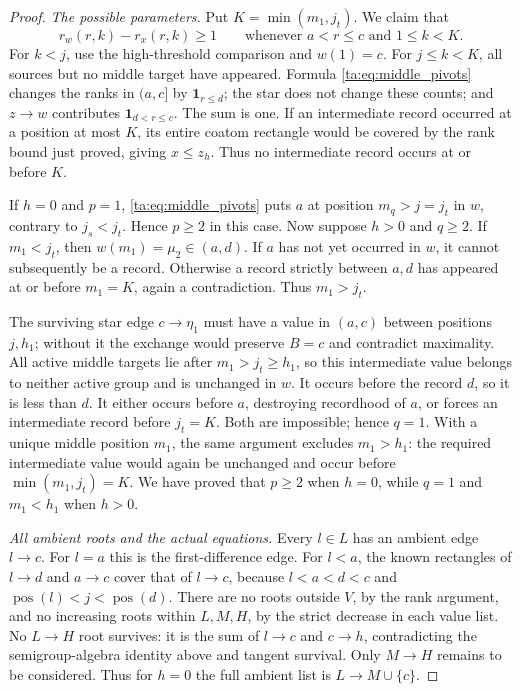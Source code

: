 \begin{proof}
\smallskip\noindent\emph{The possible parameters.}
Put $K=\min(m_1,j_t)$. We claim that
\[
 r_w(r,k)-r_x(r,k)\geq1
 \qquad\text{whenever }a<r\leq c\text{ and }1\leq k<K.
\]
For $k<j$, use the high-threshold comparison and $w(1)=c$.
For $j\leq k<K$, all sources but no middle target have appeared.
Formula \eqref{ta:eq:middle_pivots} changes the ranks in $(a,c]$
by $\mathbf1_{r\leq d}$; the star does not change these counts;
and $z\to w$ contributes $\mathbf1_{d<r\leq c}$. The sum is one.
If an intermediate record occurred at a position at most $K$, its
entire coatom rectangle would be covered by
the rank bound just proved, giving $x\leq z_h$.
Thus no intermediate record occurs at or before $K$.

If $h=0$ and $p=1$, \eqref{ta:eq:middle_pivots} puts $a$ at position
$m_q>j=j_t$ in $w$, contrary to $j_s<j_t$. Hence $p\geq2$ in this
case. Now suppose $h>0$ and $q\geq2$. If $m_1<j_t$, then
$w(m_1)=\mu_2\in(a,d)$. If $a$ has not yet occurred in $w$, it
cannot subsequently be a record. Otherwise a record strictly between
$a,d$ has appeared at or before $m_1=K$, again a contradiction.
Thus $m_1>j_t$.

The surviving star edge $c\to\eta_1$ must have a value in $(a,c)$
between positions $j,h_1$; without it the exchange would preserve
$B=c$ and contradict maximality. All active middle
targets lie after $m_1>j_t\geq h_1$, so this intermediate value
belongs to neither active group and is unchanged in $w$.
It occurs before the record $d$, so it is less than $d$.
It either occurs before $a$, destroying recordhood of $a$, or forces
an intermediate record before $j_t=K$. Both are impossible; hence
$q=1$. With a unique middle position $m_1$, the same argument excludes
$m_1>h_1$: the required intermediate value would again be unchanged
and occur before $\min(m_1,j_t)=K$. We have proved that $p\geq2$
when $h=0$, while $q=1$ and $m_1<h_1$ when $h>0$.

\smallskip\noindent\emph{All ambient roots and the actual equations.}
Every $l\in L$ has an ambient edge $l\to c$. For $l=a$ this is
the first-difference edge. For $l<a$, the known rectangles of
$l\to d$ and $a\to c$ cover that of $l\to c$, because
$l<a<d<c$ and $\operatorname{pos}(l)<j<\operatorname{pos}(d)$.
There are no roots outside $V$, by the rank argument, and no
increasing roots within $L,M,H$, by the strict decrease in each value list.
No $L\to H$ root survives: it is the sum of $l\to c$ and
$c\to h$, contradicting the semigroup-algebra identity above and tangent survival.
Only $M\to H$ remains to be considered. Thus for $h=0$ the full
ambient list is $L\to M\cup\{c\}$.


\end{proof}
